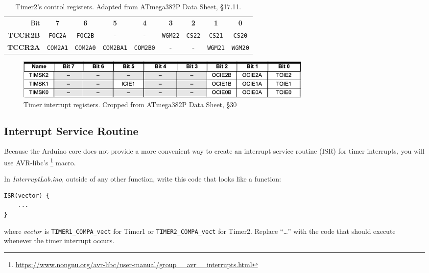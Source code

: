\begin{table}[p]
    \centering \small
    \begin{tabular}{|r||c|c|c|c|c|c|c|c||}
        \hline
        Bit             & \textbf{7}        & \textbf{6}        & \textbf{5}        & \textbf{4}        & \textbf{3}        & \textbf{2}    & \textbf{1}        & \textbf{0}        \\ \cline{2-9}
        \textbf{TCCR2B} & \texttt{FOC2A}    & \texttt{FOC2B}    & -                 & -                 & \texttt{WGM22}    & \texttt{CS22} & \texttt{CS21}     & \texttt{CS20}     \\
        \textbf{TCCR2A} & \texttt{COM2A1}   & \texttt{COM2A0}   & \texttt{COM2BA1}  & \texttt{COM2B0}   & -                 & -             & \texttt{WGM21}    & \texttt{WGM20}    \\ \hline
    \end{tabular}
    \caption{Timer2's control registers. \tiny Adapted from ATmega382P Data Sheet, §17.11. \label{table:Timer2Control}}
\end{table}

\begin{figure}[p]
    \centering
    \includegraphics[width=15cm]{TimerInterruptRegisters}
    \caption{Timer interrupt registers. \tiny Cropped from ATmega382P Data Sheet, §30 \label{fig:TimerInterruptRegisters}}
\end{figure}


\subsection{Interrupt Service Routine}

Because the Arduino core does not provide a more convenient way to create an
interrupt service routine (ISR) for timer interrupts, you will use AVR-libc's
\footnote{\url{https://www.nongnu.org/avr-libc/user-manual/group__avr__interrupts.html}}
macro.

In \textit{InterruptLab.ino}, outside of any other function, write this code that looks like a function:

\begin{lstlisting}
ISR(vector) {
    ...
}
\end{lstlisting}

where $vector$ is \lstinline{TIMER1_COMPA_vect} for Timer1 or
\lstinline{TIMER2_COMPA_vect} for Timer2. Replace ``\dots'' with the code that
should execute whenever the timer interrupt occurs.

